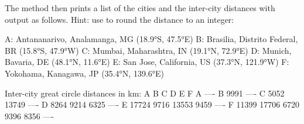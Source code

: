 \begin{exercise}
The  method then prints a list of the cities and the inter-city distances with output as follows. Hint: use  to round the distance to an integer:

\begin{stdout}
A: Antananarivo, Analamanga, MG (18.9°S, 47.5°E)
B: Brasilia, Distrito Federal, BR (15.8°S, 47.9°W)
C: Mumbai, Maharashtra, IN (19.1°N, 72.9°E)
D: Munich, Bavaria, DE (48.1°N, 11.6°E)
E: San Jose, California, US (37.3°N, 121.9°W)
F: Yokohama, Kanagawa, JP (35.4°N, 139.6°E)

Inter-city great circle distances in km:
        A       B       C       D       E       F    
A      ----
B      9991    ----
C      5052   13749    ----
D      8264    9214    6325    ----
E     17724    9716   13553    9459    ----
F     11399   17706    6720    9396    8356    ---- 
\end{stdout}

\end{exercise}

